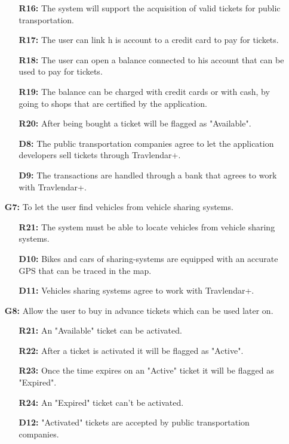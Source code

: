 \documentclass{article}
\begin{document}
\begin{enumerate}
\begin{enumerate}
\item[\textbf{R16:}] The system will support the acquisition of valid tickets for public transportation.
\item[\textbf{R17:}] The user can link h is account to a credit card to pay for tickets.
\item[\textbf{R18:}] The user can open a balance connected to his account that can be used to pay for tickets.
\item[\textbf{R19:}] The balance can be charged with credit cards or with cash, by going to shops that are certified by the application.
\item[\textbf{R20:}] After being bought a ticket will be flagged as "Available".
\item[\textbf{D8:}] The public transportation companies agree to let the application developers sell tickets through Travlendar+.
\item[\textbf{D9:}] The transactions are handled through a bank that agrees to work with Travlendar+.
\end{enumerate}
\item[\textbf{G7:}] To let the user find vehicles from vehicle sharing systems.
\begin{enumerate}
\item[\textbf{R21:}] The system must be able to locate vehicles from vehicle sharing systems.
\item[\textbf{D10:}] Bikes and cars of sharing-systems are equipped with an accurate GPS that can be traced in the map.
\item[\textbf{D11:}] Vehicles sharing systems agree to work with Travlendar+.
\end{enumerate}
\item[\textbf{G8:}] Allow the user to buy in advance tickets which can be used later on.
\begin{enumerate}
\item[\textbf{R21:}] An "Available" ticket can be activated.
\item[\textbf{R22:}] After a ticket is activated it will be flagged as "Active".
\item[\textbf{R23:}] Once the time expires on an "Active" ticket it will be flagged as "Expired".
\item[\textbf{R24:}] An "Expired" ticket can't be activated.
\item[\textbf{D12:}] "Activated" tickets are accepted by public transportation companies.
\end{enumerate}
\end{enumerate}
\end{document}

